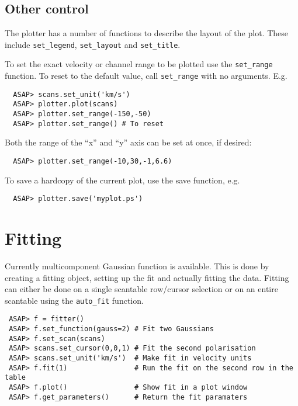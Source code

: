 \documentclass[11pt]{article}
\newcommand{\cmd}[1]{{\tt #1}}
\begin{document}
\subsection{Other control}

The plotter has a number of functions to describe the layout of the
plot. These include \cmd{set\_legend}, \cmd{set\_layout} and \cmd{set\_title}.

To set the exact velocity or channel range to be plotted use the
\cmd{set\_range} function. To reset to the default value, call
\cmd{set\_range} with no arguments. E.g.

\begin{verbatim}
  ASAP> scans.set_unit('km/s')
  ASAP> plotter.plot(scans)
  ASAP> plotter.set_range(-150,-50)
  ASAP> plotter.set_range() # To reset
\end{verbatim}

Both the range of the ``x'' and ``y'' axis can be set at once, if desired:

\begin{verbatim}
  ASAP> plotter.set_range(-10,30,-1,6.6)
\end{verbatim}

To save a hardcopy of the current plot, use the save function, e.g.

\begin{verbatim}
  ASAP> plotter.save('myplot.ps')
\end{verbatim}

\section{Fitting}

Currently multicomponent Gaussian function is
available. This is done by creating a fitting object, setting up the
fit and actually fitting the data. Fitting can either be done on a
single scantable row/cursor selection or on an entire scantable using
the \cmd{auto\_fit} function.

\begin{verbatim}
 ASAP> f = fitter()
 ASAP> f.set_function(gauss=2) # Fit two Gaussians
 ASAP> f.set_scan(scans)
 ASAP> scans.set_cursor(0,0,1) # Fit the second polarisation
 ASAP> scans.set_unit('km/s')  # Make fit in velocity units
 ASAP> f.fit(1)                # Run the fit on the second row in the table
 ASAP> f.plot()                # Show fit in a plot window
 ASAP> f.get_parameters()      # Return the fit paramaters
\end{verbatim}
\end{document}
